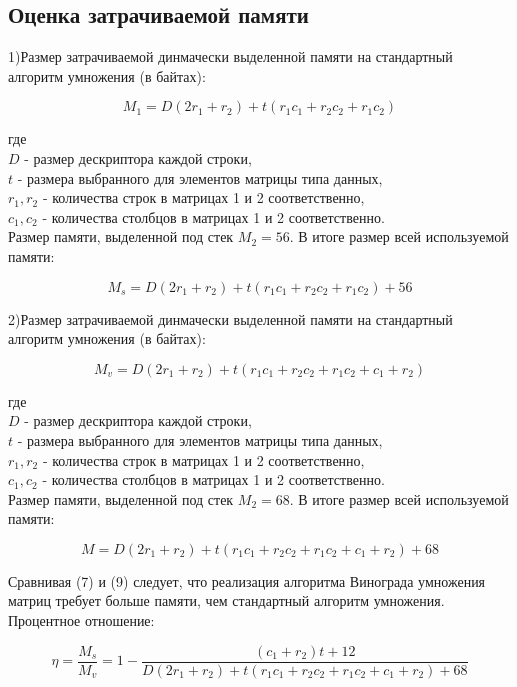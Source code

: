 \documentclass[a4paper,12pt]{article}
\begin{document}
\subsection{Оценка затрачиваемой памяти}
1)Размер затрачиваемой динмачески выделенной памяти на стандартный алгоритм умножения (в байтах):
\begin{center}
\begin{equation}
M_1 = D(2r_1 + r_2)  + t(r_1c_1 + r_2c_2 + r_1c_2)
\end{equation}
\end{center}
где \\
$D$ - размер дескриптора каждой строки,\\
$t$ - размера выбранного для элементов матрицы типа данных,\\
$r_1, r_2$ - количества строк в матрицах 1 и 2 соответственно,\\
$c_1, c_2$ - количества столбцов в матрицах 1 и 2 соответственно.\\
Размер памяти, выделенной под стек $M_2 = 56$.
В итоге размер всей используемой памяти:
\begin{center}
\begin{equation}
M_s = D(2r_1 + r_2)  + t(r_1c_1 + r_2c_2 + r_1c_2) + 56
\end{equation}
\end{center}
2)Размер затрачиваемой динмачески выделенной памяти на стандартный алгоритм умножения (в байтах):
\begin{center}
\begin{equation}
M_v = D(2r_1 + r_2)  + t(r_1c_1 + r_2c_2 + r_1c_2 + c_1 + r_2)
\end{equation}
\end{center}
где \\
$D$ - размер дескриптора каждой строки,\\
$t$ - размера выбранного для элементов матрицы типа данных,\\
$r_1, r_2$ - количества строк в матрицах 1 и 2 соответственно,\\
$c_1, c_2$ - количества столбцов в матрицах 1 и 2 соответственно.\\
Размер памяти, выделенной под стек $M_2 = 68$.
В итоге размер всей используемой памяти:
\begin{center}
\begin{equation}
M = D(2r_1 + r_2)  + t(r_1c_1 + r_2c_2 + r_1c_2 + c_1 + r_2) + 68
\end{equation}
\end{center}
Сравнивая (7) и (9) следует, что реализация алгоритма Винограда умножения матриц требует больше памяти, чем стандартный алгоритм умножения. \\
Процентное отношение:\\
\begin{center}
\begin{equation}
\eta = \frac{M_s}{M_v} = 1 - \frac{(c_1 + r_2)t + 12}{D(2r_1 + r_2)  + t(r_1c_1 + r_2c_2 + r_1c_2 + c_1 + r_2) + 68}
\end{equation}
\end{center}
\newpage
\end{document}
